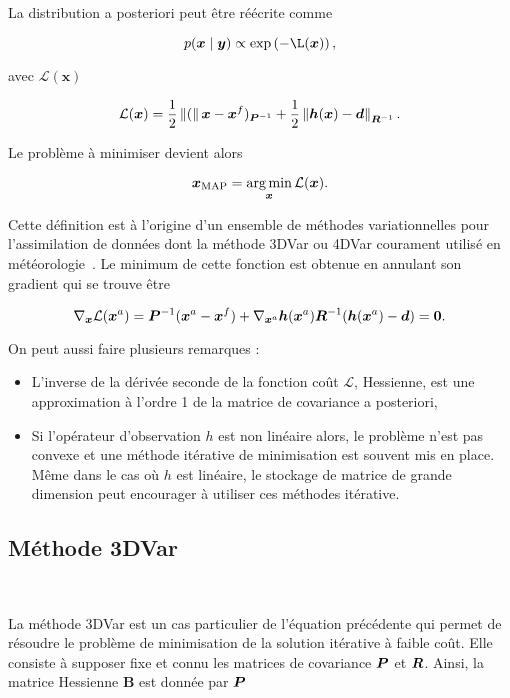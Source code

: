 La distribution a posteriori peut être réécrite comme

\begin{equation*}
    p(\bm x \mid \bm y) \propto \exp\left(- \mathcal{\L}(\bm x)\right),
\end{equation*}

avec $\mathcal L(\bm x)$

\begin{equation*}
    \mathcal L(\bm x) = \frac12 \left\lVert ( \right\rVert\bm x - \bm x^f)_{ \bm{P}^{-1}} + \frac12 \left\lVert \bm h(\bm x) - \bm d \right\rVert_{\bm{R}^{-1}}.
\end{equation*}

Le problème à minimiser devient alors

\begin{equation*}
    \bm x_{\text{MAP}} = \operatorname*{arg\,min}_{\bm x} \mathcal L(\bm x).
\end{equation*}

Cette définition est à l'origine d'un ensemble de méthodes variationnelles pour l'assimilation de données dont la méthode 3DVar ou 4DVar courament utilisé en météorologie~\cite{talagrand1997assimilation}.
Le minimum de cette fonction est obtenue en annulant son gradient qui se trouve être

\begin{equation*}
    \nabla_{\bm{x}} \mathcal L(\bm{x}^a) = \bm{P}^{-1} (\bm{x}^a - \bm{x}^f) + \nabla_{\bm{x}^a} \bm h (\bm{x}^a) \bm{R}^{-1}(\bm{h}(\bm{x}^a) - \bm d) = \bm 0.
\end{equation*}


On peut aussi faire plusieurs remarques :

\begin{itemize}
    \item L'inverse de la dérivée seconde de la fonction coût $\mathcal L$, Hessienne, est une approximation à l'ordre 1 de la matrice de covariance a posteriori,
    \item Si l'opérateur d'observation $h$ est non linéaire alors, le problème n'est pas convexe et une méthode itérative de minimisation est souvent mis en place. Même dans le cas où $h$ est linéaire, le stockage de matrice de grande dimension peut encourager à utiliser ces méthodes itérative.
\end{itemize}

\subsection{Méthode 3DVar}~\label{subsec:3dvar}

La méthode 3DVar est un cas particulier de l'équation précédente qui permet de résoudre le problème de minimisation de la solution itérative à faible coût. Elle consiste à supposer fixe et connu les matrices de covariance $\bm{P}$ et $\bm{R}$. Ainsi, la matrice Hessienne $\bm B$ est donnée par $\bm{P}$

